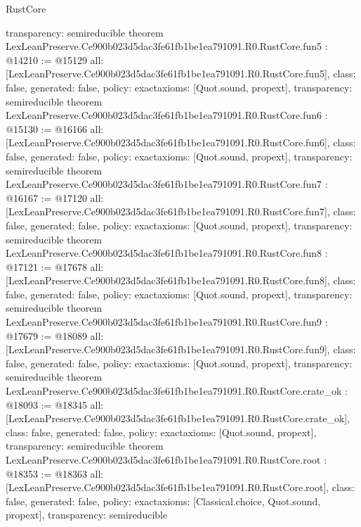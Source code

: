 \begin{lexlean}{RustCore}
\begin{coremodule}
{  transparency: semireducible
}
theorem LexLeanPreserve.Ce900b023d5dac3fe61fb1be1ea791091.R0.RustCore.fun5 : @14210 := @15129 {
  all: [LexLeanPreserve.Ce900b023d5dac3fe61fb1be1ea791091.R0.RustCore.fun5],
  class: false,
  generated: false,
  policy: exact{axioms: [Quot.sound, propext]},
  transparency: semireducible
}
theorem LexLeanPreserve.Ce900b023d5dac3fe61fb1be1ea791091.R0.RustCore.fun6 : @15130 := @16166 {
  all: [LexLeanPreserve.Ce900b023d5dac3fe61fb1be1ea791091.R0.RustCore.fun6],
  class: false,
  generated: false,
  policy: exact{axioms: [Quot.sound, propext]},
  transparency: semireducible
}
theorem LexLeanPreserve.Ce900b023d5dac3fe61fb1be1ea791091.R0.RustCore.fun7 : @16167 := @17120 {
  all: [LexLeanPreserve.Ce900b023d5dac3fe61fb1be1ea791091.R0.RustCore.fun7],
  class: false,
  generated: false,
  policy: exact{axioms: [Quot.sound, propext]},
  transparency: semireducible
}
theorem LexLeanPreserve.Ce900b023d5dac3fe61fb1be1ea791091.R0.RustCore.fun8 : @17121 := @17678 {
  all: [LexLeanPreserve.Ce900b023d5dac3fe61fb1be1ea791091.R0.RustCore.fun8],
  class: false,
  generated: false,
  policy: exact{axioms: [Quot.sound, propext]},
  transparency: semireducible
}
theorem LexLeanPreserve.Ce900b023d5dac3fe61fb1be1ea791091.R0.RustCore.fun9 : @17679 := @18089 {
  all: [LexLeanPreserve.Ce900b023d5dac3fe61fb1be1ea791091.R0.RustCore.fun9],
  class: false,
  generated: false,
  policy: exact{axioms: [Quot.sound, propext]},
  transparency: semireducible
}
theorem LexLeanPreserve.Ce900b023d5dac3fe61fb1be1ea791091.R0.RustCore.crate_ok : @18093 := @18345 {
  all: [LexLeanPreserve.Ce900b023d5dac3fe61fb1be1ea791091.R0.RustCore.crate_ok],
  class: false,
  generated: false,
  policy: exact{axioms: [Quot.sound, propext]},
  transparency: semireducible
}
theorem LexLeanPreserve.Ce900b023d5dac3fe61fb1be1ea791091.R0.RustCore.root : @18353 := @18363 {
  all: [LexLeanPreserve.Ce900b023d5dac3fe61fb1be1ea791091.R0.RustCore.root],
  class: false,
  generated: false,
  policy: exact{axioms: [Classical.choice, Quot.sound, propext]},
  transparency: semireducible
}


\end{coremodule}
\end{lexlean}
